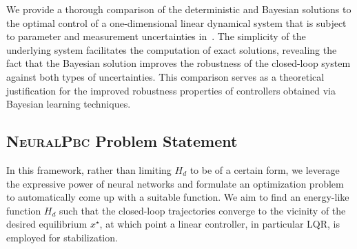 {
    \color{magenta}
    \begin{rem}
        We provide a thorough comparison of the deterministic and Bayesian
        solutions to the optimal control of a one-dimensional linear dynamical
        system that is subject to parameter and measurement uncertainties
        in~\cite{ashenafi_robust_control_design}. 
        The simplicity of the underlying system facilitates the computation of
        exact solutions, revealing the fact that the Bayesian solution improves
        the robustness of the closed-loop system against both types of
        uncertainties.
        This comparison serves as a theoretical justification for the
        improved robustness properties of controllers obtained via Bayesian learning
        techniques.


    \end{rem}
}

%


\subsection{\textsc{NeuralPbc} Problem Statement}
\label{ssec:ml-pbc}
In this framework, rather than limiting $H_d$ to be of a certain form, we
leverage the expressive power of neural networks and formulate an optimization
problem to automatically come up with a suitable function. 
%
We aim to find an energy-like function $H_d$ such that the closed-loop
trajectories converge to the vicinity of the desired equilibrium $x^\star$, at
which point a linear controller, in particular LQR, is employed for
stabilization.
%

